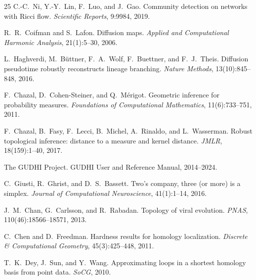 \documentclass[11pt]{article}
\begin{document}
\begin{thebibliography}{25}
C.-C.~Ni, Y.-Y.~Lin, F.~Luo, and J.~Gao.
Community detection on networks with Ricci flow.
\emph{Scientific Reports}, 9:9984, 2019.

R.~R.~Coifman and S.~Lafon.
Diffusion maps.
\emph{Applied and Computational Harmonic Analysis}, 21(1):5--30, 2006.

L.~Haghverdi, M.~B\"uttner, F.~A.~Wolf, F.~Buettner, and F.~J.~Theis.
Diffusion pseudotime robustly reconstructs lineage branching.
\emph{Nature Methods}, 13(10):845--848, 2016.

F.~Chazal, D.~Cohen-Steiner, and Q.~M\'erigot.
Geometric inference for probability measures.
\emph{Foundations of Computational Mathematics}, 11(6):733--751, 2011.

F.~Chazal, B.~Fasy, F.~Lecci, B.~Michel, A.~Rinaldo, and L.~Wasserman.
Robust topological inference: distance to a measure and kernel distance.
\emph{JMLR}, 18(159):1--40, 2017.

The GUDHI Project.
GUDHI User and Reference Manual, 2014--2024.

C.~Giusti, R.~Ghrist, and D.~S.~Bassett.
Two's company, three (or more) is a simplex.
\emph{Journal of Computational Neuroscience}, 41(1):1--14, 2016.

J.~M.~Chan, G.~Carlsson, and R.~Rabadan.
Topology of viral evolution.
\emph{PNAS}, 110(46):18566--18571, 2013.

C.~Chen and D.~Freedman.
Hardness results for homology localization.
\emph{Discrete \& Computational Geometry}, 45(3):425--448, 2011.

T.~K.~Dey, J.~Sun, and Y.~Wang.
Approximating loops in a shortest homology basis from point data.
\emph{SoCG}, 2010.

\end{thebibliography}
\end{document}
